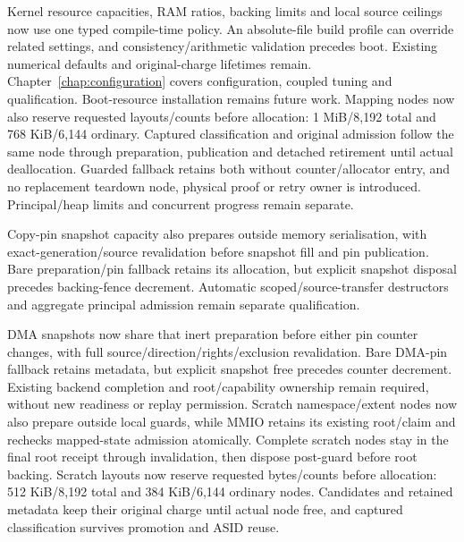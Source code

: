 \begin{itemize}
        Kernel resource capacities, RAM ratios, backing limits and local source
        ceilings now use one typed compile-time policy. An absolute-file build
        profile can override related settings, and consistency/arithmetic validation
        precedes boot. Existing numerical defaults and original-charge lifetimes
        remain. Chapter~\ref{chap:configuration} covers configuration, coupled
        tuning and qualification. Boot-resource installation remains future work.
        Mapping nodes now also reserve requested layouts/counts before allocation:
        1 MiB/8,192 total and 768 KiB/6,144 ordinary. Captured classification and
        original admission follow the same node through preparation, publication
        and detached retirement until actual deallocation. Guarded fallback
        retains both without counter/allocator entry, and no replacement teardown
        node, physical proof or retry owner is introduced. Principal/heap limits
        and concurrent progress remain separate.
        
        Copy-pin snapshot capacity also prepares outside memory serialisation,
        with exact-generation/source revalidation before snapshot fill and pin
        publication. Bare preparation/pin fallback retains its allocation, but
        explicit snapshot disposal precedes backing-fence decrement. Automatic
        scoped/source-transfer destructors and aggregate principal admission
        remain separate qualification.
        
        DMA snapshots now share that inert preparation before either pin counter
        changes, with full source/direction/rights/exclusion revalidation. Bare
        DMA-pin fallback retains metadata, but explicit snapshot free precedes
        counter decrement. Existing backend completion and root/capability
        ownership remain required, without new readiness or replay permission.
        Scratch namespace/extent nodes now also prepare outside local guards,
        while MMIO retains its existing root/claim and rechecks mapped-state
        admission atomically. Complete scratch nodes stay in the final root
        receipt through invalidation, then dispose post-guard before root backing.
        Scratch layouts now reserve requested bytes/counts before allocation:
        512 KiB/8,192 total and 384 KiB/6,144 ordinary nodes. Candidates and
        retained metadata keep their original charge until actual node free, and
        captured classification survives promotion and ASID reuse.
        

\end{itemize}
